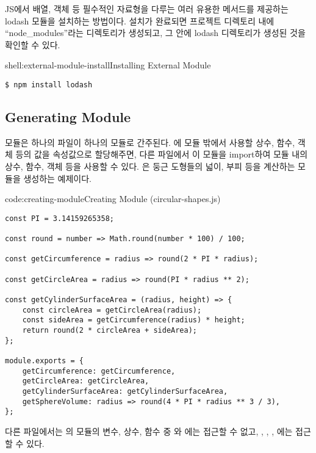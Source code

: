\은 JS에서 배열, 객체 등 필수적인 자료형을 다루는 여러 유용한 메서드를 제공하는 lodash 모듈을 설치하는 방법이다. 설치가 완료되면 프로젝트 디렉토리 내에 ``node\_modules''라는 디렉토리가 생성되고, 그 안에 lodash 디렉토리가 생성된 것을 확인할 수 있다.

\begin{shellenv}{shell:external-module-install}{Installing External Module}\begin{verbatim}
$ npm install lodash
\end{verbatim}
\end{shellenv}
\newpage

\subsection*{Generating Module}

모듈은 하나의 파일이 하나의 모듈로 간주된다. 에 모듈 밖에서 사용할 상수, 함수, 객체 등의 값을 속성값으로 할당해주면, 다른 파일에서 이 모듈을 import하여 모듈 내의 상수, 함수, 객체 등을 사용할 수 있다. 은 둥근 도형들의 넓이, 부피 등을 계산하는 모듈을 생성하는 예제이다.

\begin{codeenv}{code:creating-module}{Creating Module (circular-shapes.js)}\begin{verbatim}
const PI = 3.14159265358;

const round = number => Math.round(number * 100) / 100;

const getCircumference = radius => round(2 * PI * radius);

const getCircleArea = radius => round(PI * radius ** 2);

const getCylinderSurfaceArea = (radius, height) => {
    const circleArea = getCircleArea(radius);
    const sideArea = getCircumference(radius) * height;
    return round(2 * circleArea + sideArea);
};

module.exports = {
    getCircumference: getCircumference,
    getCircleArea: getCircleArea,
    getCylinderSurfaceArea: getCylinderSurfaceArea,
    getSphereVolume: radius => round(4 * PI * radius ** 3 / 3),
};
\end{verbatim}
\end{codeenv}

다른 파일에서는 의 모듈의 변수, 상수, 함수 중 와 에는 접근할 수 없고, , , , 에는 접근할 수 있다.

